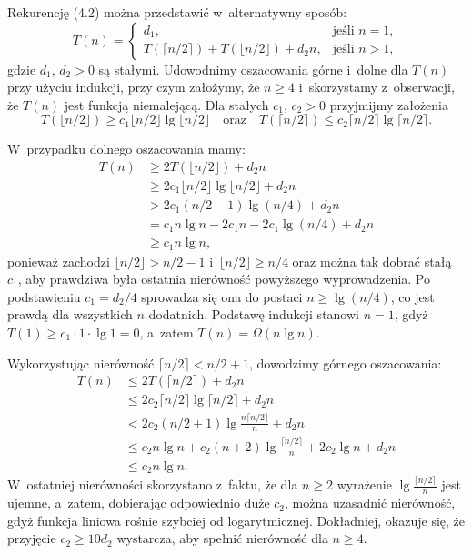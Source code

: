 \exercise %
Rekurencję (4.2) można przedstawić w~alternatywny sposób:
\[
	T(n) =
	\begin{cases}
		d_1, & \text{jeśli $n=1$}, \\
		T(\lceil n/2\rceil)+T(\lfloor n/2\rfloor)+d_2n, & \text{jeśli $n>1$},
	\end{cases}
\]
gdzie $d_1$, $d_2>0$ są stałymi.
Udowodnimy oszacowania górne i~dolne dla $T(n)$ przy użyciu indukcji, przy czym założymy, że $n\ge4$ i~skorzystamy z~obserwacji, że $T(n)$ jest funkcją niemalejącą.
Dla stałych $c_1$, $c_2>0$ przyjmijmy założenia
\[
	T(\lfloor n/2\rfloor) \ge c_1\lfloor n/2\rfloor\lg\lfloor n/2\rfloor \quad\text{oraz}\quad T(\lceil n/2\rceil) \le c_2\lceil n/2\rceil\lg\lceil n/2\rceil.
\]

W~przypadku dolnego oszacowania mamy:
\begin{align*}
	T(n) &\ge 2T(\lfloor n/2\rfloor)+d_2n \\
	&\ge 2c_1\lfloor n/2\rfloor\lg\lfloor n/2\rfloor+d_2n \\
	&> 2c_1(n/2-1)\lg(n/4)+d_2n \\
	&= c_1n\lg n-2c_1n-2c_1\!\lg(n/4)+d_2n \\
	&\ge c_1n\lg n,
\end{align*}
ponieważ zachodzi $\lfloor n/2\rfloor>n/2-1$ i~$\lfloor n/2\rfloor\ge n/4$ oraz można tak dobrać stałą $c_1$, aby prawdziwa była ostatnia nierówność powyższego wyprowadzenia.
Po podstawieniu $c_1=d_2/4$ sprowadza się ona do postaci $n\ge\lg(n/4)$, co jest prawdą dla wszystkich $n$ dodatnich.
Podstawę indukcji stanowi $n=1$, gdyż $T(1)\ge c_1\cdot 1\cdot\lg1=0$, a~zatem $T(n)=\Omega(n\lg n)$.

Wykorzystując nierówność $\lceil n/2\rceil<n/2+1$, dowodzimy górnego oszacowania:
\begin{align*}
	T(n) &\le 2T(\lceil n/2\rceil)+d_2n \\
	&\le 2c_2\lceil n/2\rceil\lg\lceil n/2\rceil+d_2n \\
	&< 2c_2(n/2+1)\lg\frac{n\lceil n/2\rceil}{n}+d_2n \\
	&\le c_2n\lg n+c_2(n+2)\lg\frac{\lceil n/2\rceil}{n}+2c_2\lg n+d_2n \\
	&\le c_2n\lg n.
\end{align*}
W~ostatniej nierówności skorzystano z~faktu, że dla $n\ge2$ wyrażenie $\lg\frac{\lceil n/2\rceil}{n}$ jest ujemne, a~zatem, dobierając odpowiednio duże $c_2$, można uzasadnić nierówność, gdyż funkcja liniowa rośnie szybciej od logarytmicznej.
Dokładniej, okazuje się, że przyjęcie $c_2\ge10d_2$ wystarcza, aby spełnić nierówność dla $n\ge4$.

